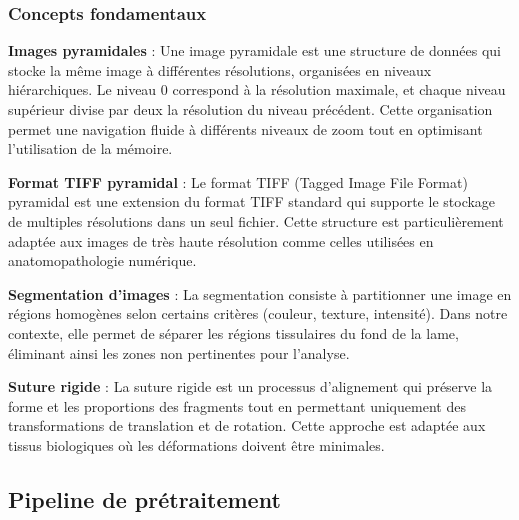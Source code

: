 \documentclass[12pt,a4paper]{report}
\begin{document}
\subsubsection{Concepts fondamentaux}

\textbf{Images pyramidales} : Une image pyramidale est une structure de données qui stocke la même image à différentes résolutions, organisées en niveaux hiérarchiques. Le niveau 0 correspond à la résolution maximale, et chaque niveau supérieur divise par deux la résolution du niveau précédent. Cette organisation permet une navigation fluide à différents niveaux de zoom tout en optimisant l'utilisation de la mémoire.

\textbf{Format TIFF pyramidal} : Le format TIFF (Tagged Image File Format) pyramidal est une extension du format TIFF standard qui supporte le stockage de multiples résolutions dans un seul fichier. Cette structure est particulièrement adaptée aux images de très haute résolution comme celles utilisées en anatomopathologie numérique.

\textbf{Segmentation d'images} : La segmentation consiste à partitionner une image en régions homogènes selon certains critères (couleur, texture, intensité). Dans notre contexte, elle permet de séparer les régions tissulaires du fond de la lame, éliminant ainsi les zones non pertinentes pour l'analyse.

\textbf{Suture rigide} : La suture rigide est un processus d'alignement qui préserve la forme et les proportions des fragments tout en permettant uniquement des transformations de translation et de rotation. Cette approche est adaptée aux tissus biologiques où les déformations doivent être minimales.

\subsection{Pipeline de prétraitement}
\end{document}
